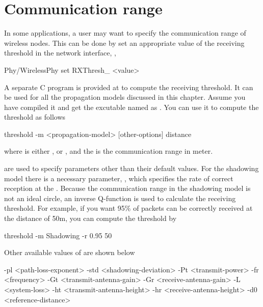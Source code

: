 
\section{Communication range}
\label{sec:commrange}

In some applications, a user may want to specify the communication range of
wireless nodes. This can be done by set an appropriate value of the receiving
threshold in the network interface, \ie,

\begin{program}
Phy/WirelessPhy set RXThresh_ <value>
\end{program}

A separate C program is provided at 
to compute the receiving threshold. It can be used for all the
propagation models discussed in this chapter. Assume you have compiled it and get
the excutable named as . You can use it to compute the threshold
as follows

\begin{program}
threshold -m <propagation-model> [other-options] distance
\end{program}

where  is either , 
or , and the  is the communication range in meter.

 are used to specify parameters other than their
default values. For the shadowing model there is a necessary parameter,
, which specifies the rate of correct reception at the
. Because the communication range in the shadowing model is not
an ideal circle, an inverse Q-function \cite{Rappaport96} is used to calculate the
receiving threshold. For example, if you want 95\% of packets can be correctly
received at the distance of 50m, you can compute the threshold by

\begin{program}
threshold -m Shadowing -r 0.95 50
\end{program}

Other available values of  are shown below

\begin{program}
-pl <path-loss-exponent> -std <shadowing-deviation> -Pt <transmit-power>
-fr <frequency> -Gt <transmit-antenna-gain> -Gr <receive-antenna-gain>
-L <system-loss> -ht <transmit-antenna-height> -hr <receive-antenna-height>
-d0 <reference-distance>
\end{program}


